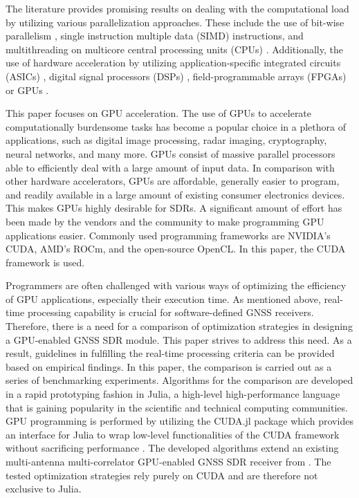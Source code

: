 \documentclass{juliacon}
\begin{document}
The literature provides promising results on dealing with the computational load by utilizing various parallelization approaches. These include the use of bit-wise parallelism \cite{Ledvina2004}, single instruction multiple data (SIMD) instructions, and multithreading on multicore central processing units (CPUs) \cite{Chen2012}. Additionally, the use of hardware acceleration by utilizing application-specific integrated circuits (ASICs) \cite{Basta2012}, digital signal processors (DSPs) \cite{Zeng2008}, field-programmable arrays (FPGAs)\cite{Cuntz2009} or GPUs \cite{Karimi2014,Park2015,Fernandez2016,Xu2017,Guo2018}.

This paper focuses on GPU acceleration. The use of GPUs to accelerate computationally burdensome tasks has become a popular choice in a plethora of applications, such as digital image processing, radar imaging, cryptography, neural networks, and many more. GPUs consist of massive parallel processors able to efficiently deal with a large amount of input data. In comparison with other hardware accelerators, GPUs are affordable, generally easier to program, and readily available in a large amount of existing consumer electronics devices. This makes GPUs highly desirable for SDRs. A significant amount of effort has been made by the vendors and the community to make programming GPU applications easier. Commonly used programming frameworks are NVIDIA's CUDA, AMD's ROCm, and the open-source OpenCL. In this paper, the CUDA framework is used.

Programmers are often challenged with various ways of optimizing the efficiency of GPU applications, especially their execution time. As mentioned above, real-time processing capability is crucial for software-defined GNSS receivers. Therefore, there is a need for a comparison of optimization strategies in designing a GPU-enabled GNSS SDR module. This paper strives to address this need. As a result, guidelines in fulfilling the real-time processing criteria can be provided based on empirical findings. In this paper, the comparison is carried out as a series of benchmarking experiments. Algorithms for the comparison are developed in a rapid prototyping fashion in Julia, a high-level high-performance language that is gaining popularity in the scientific and technical computing communities. GPU programming is performed by utilizing the CUDA.jl package which provides an interface for Julia to wrap low-level functionalities of the CUDA framework without sacrificing performance \cite{Besard2018}. The developed algorithms extend an existing multi-antenna multi-correlator GPU-enabled GNSS SDR receiver from \cite{Schoenbrod2022}. The tested optimization strategies rely purely on CUDA and are therefore not exclusive to Julia.
\end{document}
